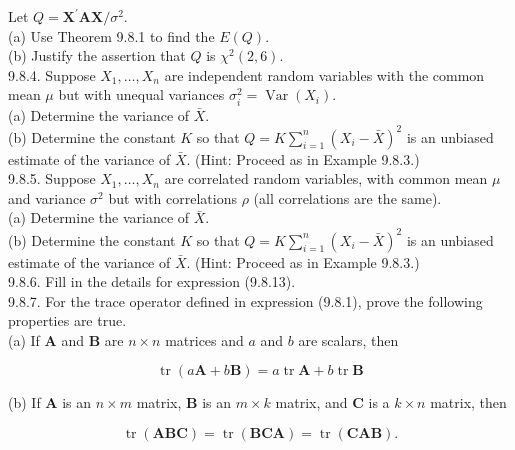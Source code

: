 Let $Q=\mathbf{X}^{\prime} \mathbf{A X} / \sigma^{2}$.\\
(a) Use Theorem 9.8.1 to find the $E(Q)$.\\
(b) Justify the assertion that $Q$ is $\chi^{2}(2,6)$.\\
9.8.4. Suppose $X_{1}, \ldots, X_{n}$ are independent random variables with the common mean $\mu$ but with unequal variances $\sigma_{i}^{2}=\operatorname{Var}\left(X_{i}\right)$.\\
(a) Determine the variance of $\bar{X}$.\\
(b) Determine the constant $K$ so that $Q=K \sum_{i=1}^{n}\left(X_{i}-\bar{X}\right)^{2}$ is an unbiased estimate of the variance of $\bar{X}$. (Hint: Proceed as in Example 9.8.3.)\\
9.8.5. Suppose $X_{1}, \ldots, X_{n}$ are correlated random variables, with common mean $\mu$ and variance $\sigma^{2}$ but with correlations $\rho$ (all correlations are the same).\\
(a) Determine the variance of $\bar{X}$.\\
(b) Determine the constant $K$ so that $Q=K \sum_{i=1}^{n}\left(X_{i}-\bar{X}\right)^{2}$ is an unbiased estimate of the variance of $\bar{X}$. (Hint: Proceed as in Example 9.8.3.)\\
9.8.6. Fill in the details for expression (9.8.13).\\
9.8.7. For the trace operator defined in expression (9.8.1), prove the following properties are true.\\
(a) If $\mathbf{A}$ and $\mathbf{B}$ are $n \times n$ matrices and $a$ and $b$ are scalars, then

$$
\operatorname{tr}(a \mathbf{A}+b \mathbf{B})=a \operatorname{tr} \mathbf{A}+b \operatorname{tr} \mathbf{B}
$$

(b) If $\mathbf{A}$ is an $n \times m$ matrix, $\mathbf{B}$ is an $m \times k$ matrix, and $\mathbf{C}$ is a $k \times n$ matrix, then

$$
\operatorname{tr}(\mathbf{A B C})=\operatorname{tr}(\mathbf{B C A})=\operatorname{tr}(\mathbf{C A B}) .
$$

